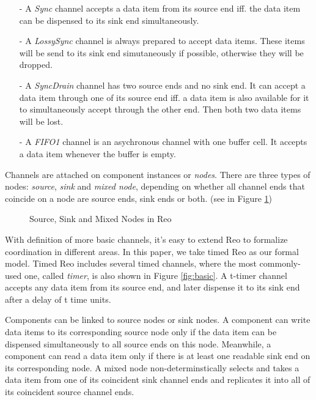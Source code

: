 \documentclass[conference, a4paper]{IEEEtran}
\begin{document}
\begin{itemize}
  \item [-] A \emph{Sync} channel accepts a data item from its source end iff. the data item can be
    dispensed to its sink end simultaneously.
  \item [-] A \emph{LossySync} channel is always prepared to accept data items. These items will be
    send to its sink end simutaneously if possible, otherwise they will be dropped.
  \item [-] A \emph{SyncDrain} channel has two source ends and no sink end. It can accept a data
    item through one of its source end iff. a data item is also available for it to simultaneously
    accept through the other end. Then both two data items will be lost.
  \item [-] A \emph{FIFO1} channel is an asychronous channel with one buffer cell. It accepts a
    data item whenever the buffer is empty.  
\end{itemize}

Channels are attached on component instances or \emph{nodes}. There are three types of nodes:
\emph{source}, \emph{sink} and \emph{mixed node}, depending on whether all channel ends that
coincide on a node are source ends, sink ends or both. (see in Figure \ref{fig:node})

\begin{figure}[ht]
  \begin{center}
    
  \end{center}
  \caption{Source, Sink and Mixed Nodes in Reo}
  \label{fig:node}
\end{figure}



With definition of more basic channels, it's easy to extend Reo to formalize coordination in
different areas. In this paper, we take timed Reo\cite{DBLP:conf/sefm/ArbabBBR04} as our formal
model. Timed Reo includes several timed channels, where the most commonly-used one, called
\emph{timer}, is also shown in Figure \ref{fig:basic}. A t-timer channel accepts any data item from
its source end, and later dispense it to its sink end after a delay of t time units.

Components can be linked to source nodes or sink nodes. A component can write data items to its
corresponding source node only if the data item can be dispensed simultaneously to all source ends
on this node. Meanwhile, a component can read a data item only if there is at least one readable
sink end on its corresponding node. A mixed node non-determinstically selects and takes a data item
from one of its coincident sink channel ends and replicates it into all of its coincident source
channel ends.
\end{document}
